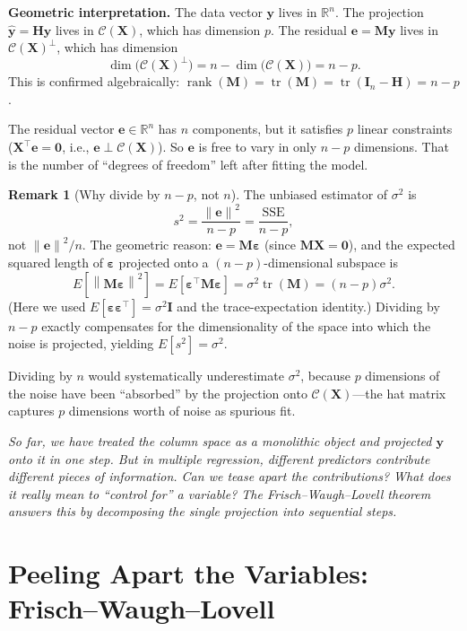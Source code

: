 \documentclass[11pt,a4paper]{article}
\theoremstyle{plain}
\theoremstyle{definition}
\newtheorem{remark}[theorem]{Remark}
\newcommand{\R}{\mathbb{R}}
\newcommand{\yhat}{\hat{\bm{y}}}
\newcommand{\bX}{\bm{X}}
\newcommand{\by}{\bm{y}}
\newcommand{\be}{\bm{e}}
\newcommand{\bH}{\bm{H}}
\newcommand{\bM}{\bm{M}}
\newcommand{\bI}{\bm{I}}
\newcommand{\Col}{\mathcal{C}}
\newcommand{\norm}[1]{\left\lVert #1 \right\rVert}
\DeclareMathOperator{\tr}{tr}
\DeclareMathOperator{\rank}{rank}
\begin{document}
\noindent\textbf{Geometric interpretation.}
The data vector $\by$ lives in $\R^n$.
The projection $\yhat = \bH\by$ lives in $\Col(\bX)$, which has dimension $p$.
The residual $\be = \bM\by$ lives in $\Col(\bX)^\perp$, which has dimension
\[
  \dim\bigl(\Col(\bX)^\perp\bigr) = n - \dim\bigl(\Col(\bX)\bigr) = n - p.
\]
This is confirmed algebraically: $\rank(\bM) = \tr(\bM) = \tr(\bI_n - \bH) = n - p$.

The residual vector $\be\in\R^n$ has $n$ components, but it satisfies $p$
linear constraints ($\bX^\top\be = \bm{0}$, i.e., $\be\perp\Col(\bX)$).
So $\be$ is free to vary in only $n - p$ dimensions.
That is the number of ``degrees of freedom'' left after fitting the model.

\begin{remark}[Why divide by $n-p$, not $n$]
The unbiased estimator of $\sigma^2$ is
\[
  s^2 = \frac{\norm{\be}^2}{n - p} = \frac{\text{SSE}}{n-p},
\]
not $\norm{\be}^2/n$.  The geometric reason: $\be = \bM\bm{\varepsilon}$
(since $\bM\bX = \bm{0}$), and the expected squared length of
$\bm{\varepsilon}$ projected onto a $(n-p)$-dimensional subspace is
\[
  E[\norm{\bM\bm{\varepsilon}}^2]
  = E[\bm{\varepsilon}^\top\bM\bm{\varepsilon}]
  = \sigma^2\tr(\bM)
  = (n-p)\sigma^2.
\]
(Here we used $E[\bm{\varepsilon}\bm{\varepsilon}^\top] = \sigma^2\bI$
and the trace-expectation identity.)
Dividing by $n-p$ exactly compensates for the dimensionality of the
space into which the noise is projected, yielding $E[s^2] = \sigma^2$.

Dividing by $n$ would systematically underestimate $\sigma^2$, because
$p$ dimensions of the noise have been ``absorbed'' by the projection
onto $\Col(\bX)$---the hat matrix captures $p$ dimensions worth of noise
as spurious fit.
\end{remark}

\medskip
\noindent\textit{So far, we have treated the column space as a monolithic
object and projected $\by$ onto it in one step.
But in multiple regression, different predictors contribute different
pieces of information.
Can we tease apart the contributions?
What does it really mean to ``control for'' a variable?
The Frisch--Waugh--Lovell theorem answers this by decomposing the
single projection into sequential steps.}


\section{Peeling Apart the Variables: Frisch--Waugh--Lovell}\label{sec:fwl}
\end{document}
